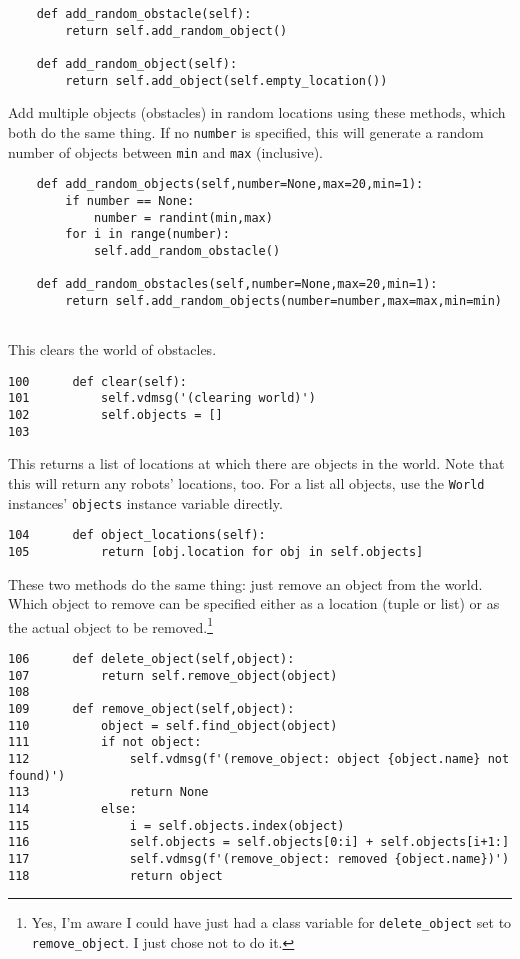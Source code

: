 \documentclass[11pt]{tufte-handout}
\begin{document}
\begin{verbatim}
    def add_random_obstacle(self):
        return self.add_random_object()

    def add_random_object(self):
        return self.add_object(self.empty_location())

\end{verbatim}

Add multiple objects (obstacles) in random locations using these methods, which both do the same thing.  If no \texttt{number} is specified, this will generate a random number of objects between \texttt{min} and \texttt{max} (inclusive).

\begin{verbatim}
    def add_random_objects(self,number=None,max=20,min=1):
        if number == None:
            number = randint(min,max)
        for i in range(number):
            self.add_random_obstacle()

    def add_random_obstacles(self,number=None,max=20,min=1):
        return self.add_random_objects(number=number,max=max,min=min)
    
\end{verbatim}




This clears the world of obstacles.

\begin{verbatim}
100      def clear(self):
101          self.vdmsg('(clearing world)')
102          self.objects = []
103  
\end{verbatim}

This returns a list of locations at which there are objects in the world.  Note that this will return any robots' locations, too.  For a list all objects, use the \texttt{World} instances' \texttt{objects} instance variable directly.

\begin{verbatim}
104      def object_locations(self):
105          return [obj.location for obj in self.objects]
\end{verbatim}

These two methods do the same thing: just remove an object from the world.  Which object to remove can be specified either as a location (tuple or list) or as the actual object to be removed.\footnote{Yes, I'm aware I could have just had a class variable for \texttt{delete\_object} set to \texttt{remove\_object}.  I just chose not to do it.}

\begin{verbatim}
106      def delete_object(self,object):
107          return self.remove_object(object)
108  
109      def remove_object(self,object):
110          object = self.find_object(object)
111          if not object:
112              self.vdmsg(f'(remove_object: object {object.name} not found)')
113              return None
114          else:
115              i = self.objects.index(object)
116              self.objects = self.objects[0:i] + self.objects[i+1:]
117              self.vdmsg(f'(remove_object: removed {object.name})')
118              return object
\end{verbatim}
\end{document}
